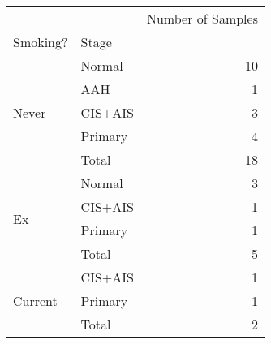 \begin{tabular}{l|lr}
\toprule
        &       & Number of Samples \\
Smoking? & Stage &                   \\
\midrule
\multirow{5}{*}{Never} & Normal &                10 \\
        & AAH &                 1 \\
        & CIS+AIS &                 3 \\
        & Primary &                 4 \\
        & Total &                18 \\
\cline{1-3}
\multirow{4}{*}{Ex} & Normal &                 3 \\
        & CIS+AIS &                 1 \\
        & Primary &                 1 \\
        & Total &                 5 \\
\cline{1-3}
\multirow{3}{*}{Current} & CIS+AIS &                 1 \\
        & Primary &                 1 \\
        & Total &                 2 \\
\bottomrule
\end{tabular}
